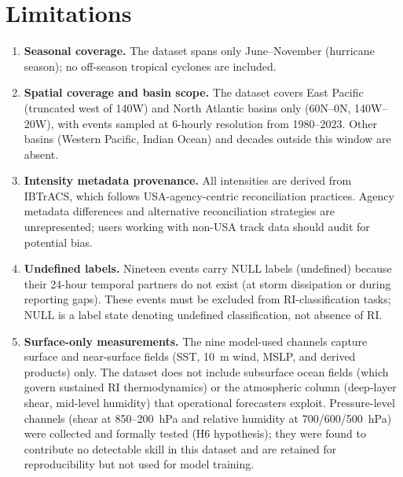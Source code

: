 \documentclass[11pt]{article}
\begin{document}
\section{Limitations}
\label{sec:limitations}

\begin{enumerate}
  \item \textbf{Seasonal coverage.} The dataset spans only June--November
  (hurricane season); no off-season tropical cyclones are included.

  \item \textbf{Spatial coverage and basin scope.} The dataset covers East
  Pacific (truncated west of 140\textdegree W) and North Atlantic basins only
  (60\textdegree N--0\textdegree N, 140\textdegree W--20\textdegree W), with
  events sampled at 6-hourly resolution from 1980--2023. Other basins (Western
  Pacific, Indian Ocean) and decades outside this window are absent.

  \item \textbf{Intensity metadata provenance.} All intensities are derived
  from IBTrACS, which follows USA-agency-centric reconciliation practices.
  Agency metadata differences and alternative reconciliation strategies are
  unrepresented; users working with non-USA track data should audit for
  potential bias.

  \item \textbf{Undefined labels.} Nineteen events carry NULL labels
  (undefined) because their 24-hour temporal partners do not exist (at storm
  dissipation or during reporting gaps). These events must be excluded from
  RI-classification tasks; NULL is a label state denoting undefined
  classification, not absence of RI.

  \item \textbf{Surface-only measurements.} The nine model-used channels
  capture surface and near-surface fields (SST, 10~m wind, MSLP, and derived
  products) only. The dataset does not include subsurface ocean fields (which
  govern sustained RI thermodynamics) or the atmospheric column (deep-layer
  shear, mid-level humidity) that operational forecasters exploit.
  Pressure-level channels (shear at 850--200~hPa and relative humidity at
  700/600/500~hPa) were collected and formally tested (H6 hypothesis); they
  were found to contribute no detectable skill in this dataset and are retained
  for reproducibility but not used for model training.


\end{enumerate}
\end{document}
